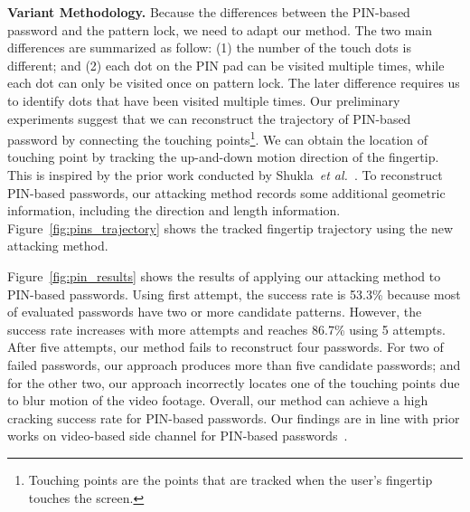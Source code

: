         \noindent \textbf{Variant Methodology.} Because the differences
        between the PIN-based password and the pattern lock, we need to adapt our method. The two
        main differences are summarized as follow: (1) the number of the
        touch dots is different; and (2) each dot on the PIN pad can be
        visited multiple times, while each dot can only be visited once on
        pattern lock. The later difference requires us to identify dots that
        have been visited multiple times.  Our preliminary experiments
        suggest that we can reconstruct the trajectory of PIN-based password
        by connecting the touching points\footnote{Touching points are the
        points that are tracked when the user's fingertip touches the screen.}. We
        can obtain the location of touching point by tracking the up-and-down
        motion direction of the fingertip. This is inspired by the prior work
        conducted by Shukla~\emph{et al.}~\cite{shukla2014beware}. To reconstruct
        PIN-based passwords, our attacking method records some additional
        geometric information, including the direction and length
        information. Figure~\ref{fig:pins_trajectory} shows the tracked
        fingertip trajectory using the new attacking method.

        Figure~\ref{fig:pin_results} shows the
        results of applying our attacking method to PIN-based passwords.
        Using first attempt, the success rate is  53.3\% because most of
        evaluated passwords have two or more candidate patterns. However, the
        success rate increases with more attempts and reaches 86.7\% using 5
        attempts. After five attempts, our method fails to reconstruct four
        passwords. For two of failed passwords, our approach produces more
        than five candidate passwords; and for the other two, our approach
        incorrectly locates one of the touching points due to  blur
        motion of the video footage. Overall, our method can achieve a high
        cracking success rate for PIN-based passwords. Our findings are in
        line with prior works on video-based side channel for PIN-based
        passwords~\cite{shukla2014beware}.

%

